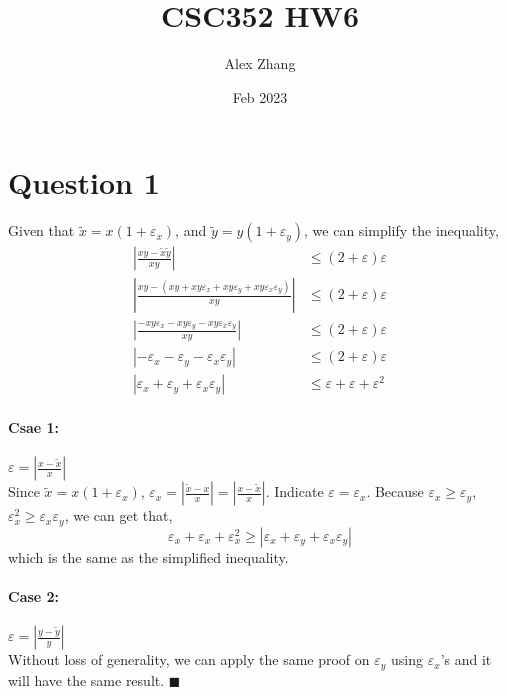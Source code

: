 \documentclass{article}
\title{CSC352 HW6}
\author{Alex Zhang}
\date{Feb 2023}
\begin{document}
\maketitle

\section*{Question 1}
Given that $\tilde{x} = x(1+\varepsilon_x)$, and $\tilde{y} = y(1+\varepsilon_y)$, we can simplify the inequality,
\begin{align}
    \left| \frac{xy-\tilde{x}\tilde{y}}{xy}\right| &\leq (2+\varepsilon)\varepsilon \nonumber \\
    \left| \frac{xy-(xy+xy\varepsilon_x+xy\varepsilon_y+xy\varepsilon_x\varepsilon_y)}{xy}\right| &\leq (2+\varepsilon)\varepsilon \nonumber \\
    \left| \frac{-xy\varepsilon_x-xy\varepsilon_y-xy\varepsilon_x\varepsilon_y}{xy}\right| &\leq (2+\varepsilon)\varepsilon \nonumber \\
    \left| -\varepsilon_x-\varepsilon_y-\varepsilon_x\varepsilon_y\right| &\leq (2+\varepsilon)\varepsilon \nonumber \\
    \left| \varepsilon_x+\varepsilon_y+\varepsilon_x\varepsilon_y\right| &\leq \varepsilon + \varepsilon + \varepsilon^2 \nonumber
\end{align}
\paragraph*{Csae 1:} $\varepsilon = \left|\frac{x-\tilde{x}}{x}\right|$\\
Since $\tilde{x} = x(1+\varepsilon_x)$, $\varepsilon_x = \left|\frac{\tilde{x}-x}{x}\right| =  \left|\frac{x-\tilde{x}}{x}\right| $. Indicate
$\varepsilon = \varepsilon_x$. Because $\varepsilon_x \geq \varepsilon_y$, $\varepsilon_x^2 \geq \varepsilon_x \varepsilon_y$, we can get that,
$$\varepsilon_x + \varepsilon_x + \varepsilon_x^2 \geq \left| \varepsilon_x+\varepsilon_y+\varepsilon_x\varepsilon_y\right| $$
which is the same as the simplified inequality.

\paragraph*{Case 2:} $\varepsilon = \left|\frac{y-\tilde{y}}{y}\right|$\\
Without loss of generality, we can apply the same proof on $\varepsilon_y$ using $\varepsilon_x$'s and it will have the same result. $\blacksquare$
\end{document}
